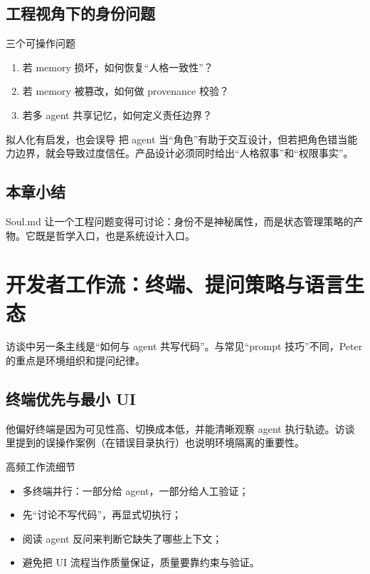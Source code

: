 \documentclass[a4paper]{article}
\begin{document}
\subsection{工程视角下的身份问题}

\begin{knowledgebox}{三个可操作问题}
\begin{enumerate}
    \item 若 memory 损坏，如何恢复“人格一致性”？ 
    \item 若 memory 被篡改，如何做 provenance 校验？
    \item 若多 agent 共享记忆，如何定义责任边界？
\end{enumerate}
\end{knowledgebox}

\begin{warningbox}{拟人化有启发，也会误导}
把 agent 当“角色”有助于交互设计，但若把角色错当能力边界，就会导致过度信任。产品设计必须同时给出“人格叙事”和“权限事实”。
\end{warningbox}

\subsection{本章小结}
Soul.md 让一个工程问题变得可讨论：身份不是神秘属性，而是状态管理策略的产物。它既是哲学入口，也是系统设计入口。

\section{开发者工作流：终端、提问策略与语言生态}

访谈中另一条主线是“如何与 agent 共写代码”。与常见“prompt 技巧”不同，Peter 的重点是环境组织和提问纪律。

\subsection{终端优先与最小 UI}

他偏好终端是因为可见性高、切换成本低，并能清晰观察 agent 执行轨迹。访谈里提到的误操作案例（在错误目录执行）也说明环境隔离的重要性。

\begin{knowledgebox}{高频工作流细节}
\begin{itemize}
    \item 多终端并行：一部分给 agent，一部分给人工验证；
    \item 先“讨论不写代码”，再显式切执行；
    \item 阅读 agent 反问来判断它缺失了哪些上下文；
    \item 避免把 UI 流程当作质量保证，质量要靠约束与验证。
\end{itemize}
\end{knowledgebox}
\end{document}
